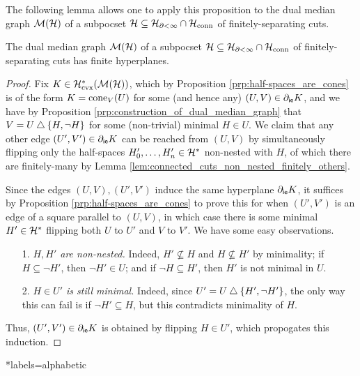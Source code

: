\documentclass[reqno]{amsart}
\begin{document}
    The following lemma allows one to apply this proposition to the dual median graph $\mathcal{M}(\mathcal{H})$ of a subpocset $\mathcal{H}\subseteq\mathcal{H}_{\partial<\infty}\cap\mathcal{H}_\mathrm{conn}$ of finitely-separating cuts.

    \begin{lemma}
        The dual median graph $\mathcal{M}(\mathcal{H})$ of a subpocset $\mathcal{H}\subseteq\mathcal{H}_{\partial<\infty}\cap\mathcal{H}_\mathrm{conn}$ of finitely-separating cuts has finite hyperplanes.
    \end{lemma}
    \begin{proof}
        Fix $K\in\mathcal{H}^\ast_\mathrm{cvx}(\mathcal{M}(\mathcal{H}))$, which by Proposition \ref{prp:half-spaces_are_cones} is of the form $K=\operatorname{cone}_V(U)$ for some (and hence any) $(U,V)\in\partial_\mathsf{ie}K$, and we have by Proposition \ref{prp:construction_of_dual_median_graph} that $V=U\bigtriangleup\left\{H,\lnot H\right\}$ for some (non-trivial) minimal $H\in U$. We claim that any other edge $(U',V')\in\partial_\mathsf{ie}K$ can be reached from $(U,V)$ by simultaneously flipping only the half-spaces $H'_0,\dots,H'_n\in\mathcal{H}^\ast$ non-nested with $H$, of which there are finitely-many by Lemma \ref{lem:connected_cuts_non_nested_finitely_others}.

        Since the edges $(U,V),(U',V')$ induce the same hyperplane $\partial_\mathsf{ie}K$, it suffices by Proposition \ref{prp:half-spaces_are_cones} to prove this for when $(U',V')$ is an edge of a square parallel to $(U,V)$, in which case there is some minimal $H'\in\mathcal{H}^\ast$ flipping both  $U$ to $U'$ and $V$ to $V'$. We have some easy observations.
        \begin{enumerate}
            \item[1.] \textit{$H,H'$ are non-nested.} Indeed, $H'\not\subseteq H$ and $H\not\subseteq H'$ by minimality; if $H\subseteq\lnot H'$, then $\lnot H'\in U$; and if $\lnot H\subseteq H'$, then $H'$ is not minimal in $U$.
            \item[2.] \textit{$H\in U'$ is still minimal.} Indeed, since $U'=U\bigtriangleup\left\{H',\lnot H'\right\}$, the only way this can fail is if $\lnot H'\subseteq H$, but this contradicts minimality of $H$.
        \end{enumerate}
        Thus, $(U',V')\in\partial_\mathsf{ie}K$ is obtained by flipping $H\in U'$, which propogates this induction.
    \end{proof}

    \begin{bibdiv}
        \begin{biblist}*{labels={alphabetic}}
        \end{biblist}
    \end{bibdiv}
\end{document}
